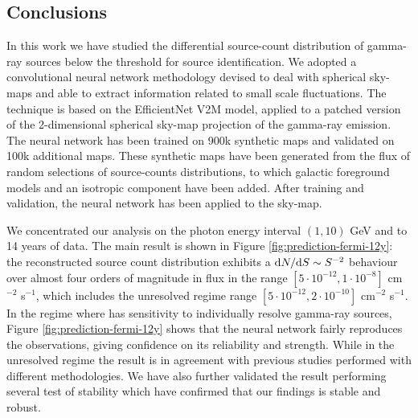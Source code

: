 \subsection{Conclusions}


In this work we have studied the differential source-count distribution of gamma-ray sources below the \fermi  threshold for source identification. We  adopted a convolutional neural network methodology devised to deal with spherical sky-maps and able to extract information related to small scale fluctuations. The technique is based on the EfficientNet V2M model, applied to a patched version of the 2-dimensional spherical sky-map projection of the gamma-ray emission. The neural network has been trained on 900k synthetic maps and validated on 100k additional maps. These synthetic maps have been generated from the flux of random selections of source-counts distributions, to which galactic foreground models and an isotropic component have been added. After training and validation, the neural network has been applied to the \fermi sky-map.

We concentrated our analysis on the photon energy interval $(1,10)$ GeV and to 14 years of data. The main result is shown in Figure \ref{fig:prediction-fermi-12y}: the reconstructed source count distribution exhibits a $\text{d}N/\text{d}S \sim S^{-2}$ behaviour over almost four orders of magnitude in flux in the range  
$[5 \cdot 10^{-12} , 1 \cdot 10^{-8}]$ cm$^{-2}$ s$^{-1}$, which includes the unresolved regime range 
$[5 \cdot 10^{-12}, 2 \cdot 10^{-10}]$ cm$^{-2}$ s$^{-1}$.
In the regime where \fermi has sensitivity to individually resolve gamma-ray sources, Figure \ref{fig:prediction-fermi-12y} shows that the neural network fairly reproduces the observations, giving confidence on its reliability and strength.
While in the unresolved regime the result is in agreement with previous studies performed with different methodologies.
We have also further validated the result performing several test of stability which have confirmed that  our findings is stable and robust.

